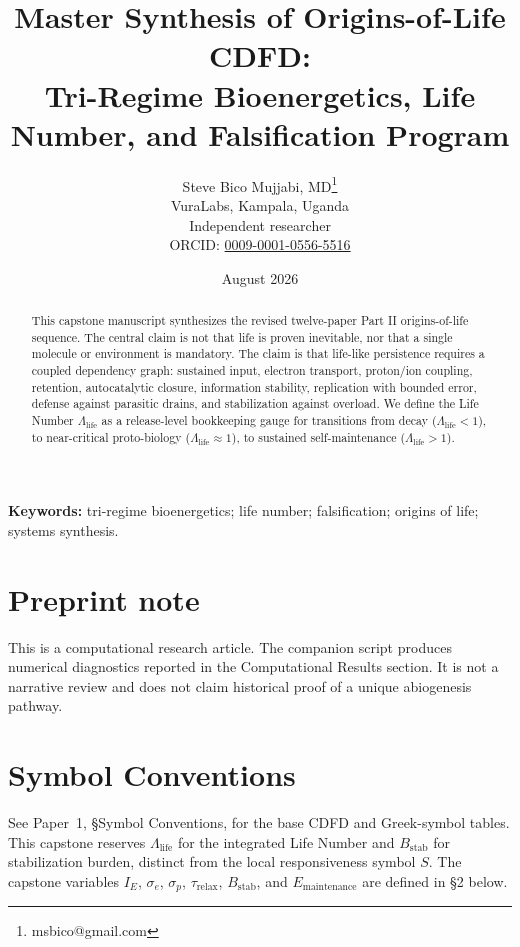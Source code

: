 \documentclass[11pt,a4paper]{article}
\title{Master Synthesis of Origins-of-Life CDFD:\\ Tri-Regime Bioenergetics, Life Number, and Falsification Program}
\author{Steve Bico Mujjabi, MD\thanks{msbico@gmail.com}\\
VuraLabs, Kampala, Uganda\\
Independent researcher\\
ORCID: \href{https://orcid.org/0009-0001-0556-5516}{0009-0001-0556-5516}}
\date{August 2026}
\begin{document}
\maketitle

\begin{abstract}
This capstone manuscript synthesizes the revised twelve-paper Part II origins-of-life sequence. The central claim is not that life is proven inevitable, nor that a single molecule or environment is mandatory. The claim is that life-like persistence requires a coupled dependency graph: sustained input, electron transport, proton/ion coupling, retention, autocatalytic closure, information stability, replication with bounded error, defense against parasitic drains, and stabilization against overload. We define the Life Number $\Lambda_{\mathrm{life}}$ as a release-level bookkeeping gauge for transitions from decay ($\Lambda_{\mathrm{life}} < 1$), to near-critical proto-biology ($\Lambda_{\mathrm{life}} \approx 1$), to sustained self-maintenance ($\Lambda_{\mathrm{life}} > 1$).
\end{abstract}

\noindent\textbf{Keywords:} tri-regime bioenergetics; life number; falsification; origins of life; systems synthesis.

\section*{Preprint note}
This is a computational research article. The companion script produces numerical diagnostics reported in the Computational Results section. It is not a narrative review and does not claim historical proof of a unique abiogenesis pathway.

\section*{Symbol Conventions}

\noindent See Paper~1, \S Symbol Conventions, for the base CDFD and Greek-symbol tables. This capstone reserves $\Lambda_{\mathrm{life}}$ for the integrated Life Number and $B_{\mathrm{stab}}$ for stabilization burden, distinct from the local responsiveness symbol $S$. The capstone variables $I_E$, $\sigma_e$, $\sigma_p$, $\tau_{\mathrm{relax}}$, $B_{\mathrm{stab}}$, and $E_{\mathrm{maintenance}}$ are defined in \S2 below.
\end{document}
